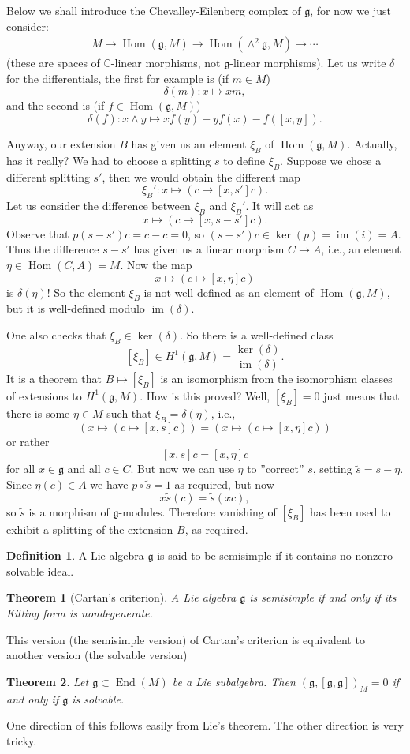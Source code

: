 \documentclass[12pt]{article}
\theoremstyle{plain}
\newtheorem{thm}{Theorem}[section]
\theoremstyle{definition}
\newtheorem{defn}{Definition}[section]
\numberwithin{equation}{section}
\DeclareMathOperator{\en}{End}
\DeclareMathOperator{\Hom}{Hom}
\DeclareMathOperator{\img}{im}
\newcommand{\wtil}[1]{\widetilde{#1}}
\newcommand{\C}{\mathbb{C}}
\newcommand{\g}{\mathfrak{g}}
\begin{document}
Below we shall introduce the Chevalley-Eilenberg complex of $\g$, for now we just consider:
\begin{align*}
M \rightarrow \Hom(\g, M) \rightarrow \Hom(\wedge^2\g, M) \rightarrow \cdots
\end{align*}
(these are spaces of $\C$-linear morphisms, not $\g$-linear morphisms). Let us write $\delta$ for the differentials, the first for example is (if $m \in M$)
\[
\delta(m) : x \mapsto x m,
\]
and the second is (if $f \in \Hom(\g, M)$)
\[
\delta(f) : x \wedge y \mapsto x f(y) - y f(x) - f([x, y]).
\]





Anyway, our extension $B$ has given us an element $\xi_B$ of $\Hom(\g, M)$. Actually, has it really? We had to choose a splitting $s$ to define $\xi_B$. Suppose we chose a different splitting $s'$, then we would obtain the different map
\[
\xi_B' : x \mapsto (c \mapsto [x, s']c).
\]
Let us consider the difference between $\xi_B$ and $\xi_B'$. It will act as
\[
x \mapsto (c \mapsto [x, s - s']c).
\]
Observe that $p(s-s')c = c-c=0$, so $(s-s')c \in \ker(p) = \img(i) = A$. Thus the difference $s-s'$ has given us a linear morphism $C \rightarrow A$, i.e., an element $\eta \in \Hom(C, A) = M$. Now the map
\[
x \mapsto (c \mapsto [x, \eta]c)
\]
is $\delta(\eta)$! So the element $\xi_B$ is not well-defined as an element of $\Hom(\g, M)$, but it is well-defined modulo $\img(\delta)$.

One also checks that $\xi_B \in \ker(\delta)$. So there is a well-defined class
\[
[\xi_B] \in H^1(\g, M) = \frac{\ker(\delta)}{\img(\delta)}.
\]
It is a theorem that $B \mapsto [\xi_B]$ is an isomorphism from the isomorphism classes of extensions to $H^1(\g, M)$. How is this proved? Well, $[\xi_B] = 0$ just means that there is some $\eta \in M$ such that $\xi_B = \delta(\eta)$, i.e.,
\[
(x \mapsto (c \mapsto [x, s]c)) = (x \mapsto (c \mapsto [x, \eta]c))
\]
or rather
\[
[x, s]c = [x, \eta]c
\]
for all $x \in \g$ and all $c \in C$. But now we can use $\eta$ to ''correct'' $s$, setting $\wtil{s} = s - \eta$. Since $\eta(c) \in A$ we have $p \circ \wtil{s} = 1$ as required, but now
\[
x \wtil{s}(c) = \wtil{s}(xc),
\]
so $\wtil{s}$ is a morphism of $\g$-modules. Therefore vanishing of $[\xi_B]$ has been used to exhibit a splitting of the extension $B$, as required.


\begin{defn}
A Lie algebra $\g$ is said to be semisimple if it contains no nonzero solvable ideal.
\end{defn}
\begin{thm}[Cartan's criterion]
A Lie algebra $\g$ is semisimple if and only if its Killing form is nondegenerate.
\end{thm}
This version (the semisimple version) of Cartan's criterion is equivalent to another version (the solvable version)
\begin{thm}\label{thm:CC.sol}
Let $\g \subset \en(M)$ be a Lie subalgebra. Then $(\g, [\g, \g])_M = 0$ if and only if $\g$ is solvable.
\end{thm}
One direction of this follows easily from Lie's theorem. The other direction is very tricky.
\end{document}
